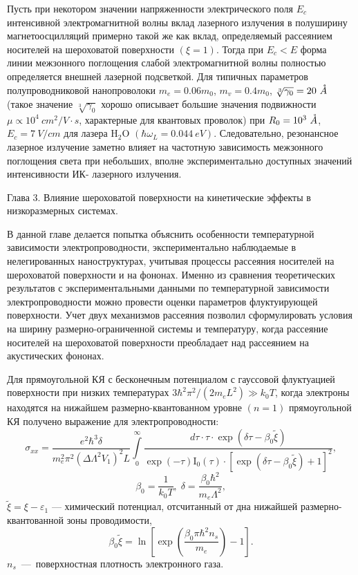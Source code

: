 Пусть при некотором значении напряженности электрического поля $E_c$ интенсивной электромагнитной волны вклад лазерного излучения в полуширину магнетоосцилляций примерно такой же как вклад, определяемый рассеянием носителей на шероховатой поверхности $(\xi =1)$. Тогда при $E_c<E$ форма линии межзонного поглощения слабой электромагнитной волны полностью определяется внешней лазерной подсветкой. Для типичных параметров полупроводниковой нанопроволоки $m_e=0.06m_0$, $m_v=0.4m_0$, $\sqrt[3]{\gamma_0}=20\ \AA $ (такое значение $\sqrt[3]{\gamma_0}$ хорошо описывает большие значения подвижности $\mu \propto 10^4\ cm^2/V\cdot s$, характерные для квантовых проволок) при $R_0=10^3\ \AA $, $E_c= 7\ V / cm$ для лазера $\mathrm{H_2 O}$ $\left(\hbar {\omega }_L=0.044\ eV\right)$. Следовательно, резонансное лазерное излучение заметно влияет на частотную зависимость межзонного поглощения света при небольших, вполне экспериментально доступных значений интенсивности ИК- лазерного излучения.

Глава 3. Влияние шероховатой поверхности на кинетические эффекты в низкоразмерных системах.

В данной главе делается попытка объяснить особенности температурной зависимости электропроводности, экспериментально наблюдаемые в нелегированных наноструктурах, учитывая процессы рассеяния носителей на шероховатой поверхности и на фононах. Именно из сравнения теоретических результатов с экспериментальными данными по температурной зависимости электропроводности можно провести оценки параметров флуктуирующей поверхности. Учет двух механизмов рассеяния позволил сформулировать условия на ширину размерно-ограниченной системы и температуру, когда рассеяние носителей на шероховатой поверхности преобладает над рассеянием на акустических фононах.

Для прямоугольной КЯ с бесконечным потенциалом с гауссовой флуктуацией поверхности при низких температурах  $3\hbar^2 \pi^2 /\left(2m_e L^2 \right) \gg k_0 T$, когда электроны находятся на нижайшем размерно-квантованном уровне $(n=1)$ прямоугольной КЯ получено выражение для электропроводности:
\begin{equation} \label{eq:syn_15}
\sigma _{xx} =\frac{e^2 \hbar^3 \delta}{m_e^2 \pi^2 \left(\Delta \Lambda^2 V_1 \right)^2 L} \int\limits_0^\infty { \frac{d\tau \cdot \tau \cdot \exp \left(\delta \tau -\beta_0 \tilde{\xi }\right)}{\exp(-\tau )\mathrm{I}_0 (\tau )\cdot \left[\exp \left(\delta \tau -\beta_0 \tilde{\xi }\right)+1\right]^2 }},
\end{equation}
\[
\beta_0 = \frac{1}{k_0 T}, \; \delta =\frac{\beta_0 \hbar^2 }{m_e \Lambda^2 },
\] 
$\tilde{\xi }=\xi -\varepsilon _{1} $ --- химический потенциал, отсчитанный от дна нижайшей размерно-квантованной зоны проводимости,
\begin{equation} \label{eq:syn_16}
\beta_0 \tilde{\xi }=\ln\left[\exp\left(\frac{\beta_0 \pi \hbar^2 n_s }{m_e} \right)-1\right].
\end{equation}
$n_s $~---~поверхностная плотность электронного газа.

